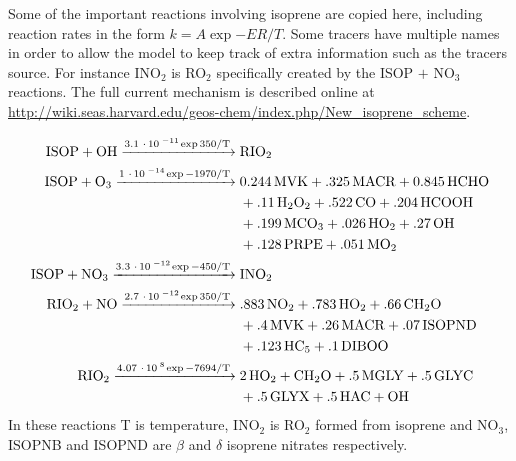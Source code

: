     Some of the important reactions involving isoprene are copied here, including reaction rates in the form $ k = A \exp{-ER/T}$.
    Some tracers have multiple names in order to allow the model to keep track of extra information such as the tracers source.
    For instance INO$_2$ is RO$_2$ specifically created by the ISOP $+$ NO$_3$ reactions.
    The full current mechanism is described online at \url{http://wiki.seas.harvard.edu/geos-chem/index.php/New_isoprene_scheme}.
    
    \begin{align} \begin{split}
    \label{Model:GC:Mechanisms:eqn_mechanisms}
    \ce{
      ISOP + OH ->[3.1*10^{-11} \exp{350/T}] & RIO2 \\ 
      ISOP + O3 ->[1*10^{-14} \exp{-1970/T}] & 0.244MVK + .325MACR + 0.845HCHO \\
      & + .11H2O2 + .522CO + .204HCOOH \\
      & + .199MCO3 +.026HO2 + .27OH \\
      & + .128PRPE + .051MO2 \\ 
      ISOP + NO3 ->[3.3*10^{-12} \exp{-450/T}] & INO2 \\
      RIO2 + NO ->[2.7*10^{-12} \exp{350/T}] & .883NO2 + .783HO2 + .66CH2O \\
      & + .4MVK + .26MACR + .07ISOPND \\
      & + .123HC5 + .1DIBOO \\
      RIO2 ->[4.07*10^{8} \exp{-7694/T}] & 2HO2 + CH2O + .5MGLY + .5GLYC \\
      & + .5GLYX + .5HAC + OH
    }
    \end{split} \end{align}
    In these reactions T is temperature, INO$_2$ is RO$_2$ formed from isoprene and NO$_3$, ISOPNB and ISOPND are $\beta$ and $\delta$ isoprene nitrates respectively.
  
